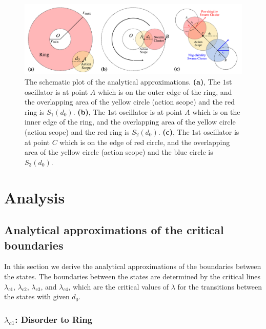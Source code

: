 \documentclass[%
 aip,
 amsmath,amssymb,
 reprint,%
]{revtex4-1}
\begin{document}
\begin{figure}
    \includegraphics[width=\textwidth]{./figs/analyticalEps.pdf}
    \caption{
        \label{fig:analyticalEps}
        The schematic plot of the analytical approximations.
        \textbf{(a)}, The $1$st oscillator is at point $A$ which is on the outer edge of the ring, and the overlapping area of the yellow circle (action scope) and the red ring is $S_1\left( d_0 \right)$.
        \textbf{(b)}, The $1$st oscillator is at point $A$ which is on the inner edge of the ring, and the overlapping area of the yellow circle (action scope) and the red ring is $S_2\left( d_0 \right)$.
        \textbf{(c)}, The $1$st oscillator is at point $C$ which is on the edge of red circle, and the overlapping area of the yellow circle (action scope) and the blue circle is $S_3\left( d_0 \right)$.
    }
\end{figure}

\section{Analysis}

\subsection{\label{critical} Analytical approximations of the critical boundaries}

In this section we derive the analytical approximations of the boundaries between the states. 
The boundaries between the states are determined by the critical lines $\lambda_{c1}$, $\lambda_{c2}$, $\lambda_{c3}$, and $\lambda_{c4}$, which are the critical values of $\lambda$ for the transitions between the states with given $d_0$.

\subsubsection{$\lambda_{c1}$: Disorder to Ring}
\end{document}
